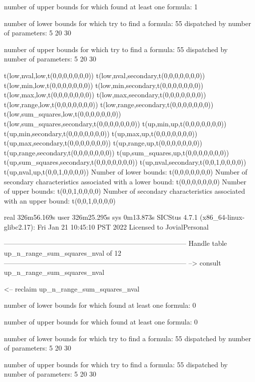 number of upper bounds for which found at least one formula: 1

number of lower bounds for which try to find a formula: 55
dispatched by number of parameters: 5  20  30

number of upper bounds for which try to find a formula: 55
dispatched by number of parameters: 5  20  30

t(low,nval,low,t(0,0,0,0,0,0,0))
t(low,nval,secondary,t(0,0,0,0,0,0,0))
t(low,min,low,t(0,0,0,0,0,0,0))
t(low,min,secondary,t(0,0,0,0,0,0,0))
t(low,max,low,t(0,0,0,0,0,0,0))
t(low,max,secondary,t(0,0,0,0,0,0,0))
t(low,range,low,t(0,0,0,0,0,0,0))
t(low,range,secondary,t(0,0,0,0,0,0,0))
t(low,sum_squares,low,t(0,0,0,0,0,0,0))
t(low,sum_squares,secondary,t(0,0,0,0,0,0,0))
t(up,min,up,t(0,0,0,0,0,0,0))
t(up,min,secondary,t(0,0,0,0,0,0,0))
t(up,max,up,t(0,0,0,0,0,0,0))
t(up,max,secondary,t(0,0,0,0,0,0,0))
t(up,range,up,t(0,0,0,0,0,0,0))
t(up,range,secondary,t(0,0,0,0,0,0,0))
t(up,sum_squares,up,t(0,0,0,0,0,0,0))
t(up,sum_squares,secondary,t(0,0,0,0,0,0,0))
t(up,nval,secondary,t(0,0,1,0,0,0,0))
t(up,nval,up,t(0,0,1,0,0,0,0))
Number of lower bounds:                                             t(0,0,0,0,0,0,0)
Number of secondary characteristics associated with a lower bound:  t(0,0,0,0,0,0,0)
Number of upper bounds:                                             t(0,0,1,0,0,0,0)
Number of secondary characteristics associated with an upper bound: t(0,0,1,0,0,0,0)

real	326m56.169s
user	326m25.295s
sys	0m13.873s
SICStus 4.7.1 (x86_64-linux-glibc2.17): Fri Jan 21 10:45:10 PST 2022
Licensed to JovialPersonal


--------------------------------------------------------------------------------
Handle table up_n_range_sum_squares_nval of 12
--------------------------------------------------------------------------------
--> consult up_n_range_sum_squares_nval

<-- reclaim up_n_range_sum_squares_nval

number of lower bounds for which found at least one formula: 0

number of upper bounds for which found at least one formula: 0

number of lower bounds for which try to find a formula: 55
dispatched by number of parameters: 5  20  30

number of upper bounds for which try to find a formula: 55
dispatched by number of parameters: 5  20  30

